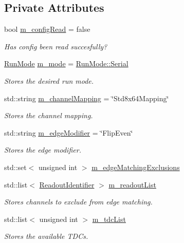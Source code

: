 \subsection*{Private Attributes}
\begin{DoxyCompactItemize}
\item 
bool \hyperlink{class_config_a82bcc998ae058699369aee4a189f0ad1}{m\+\_\+config\+Read} = false
\begin{DoxyCompactList}\small\item\em Has config been read succesfully? \end{DoxyCompactList}\item 
\hyperlink{_modes_enum_8hpp_a3dfe11cf1a3a8121f6cd7fec4bf5947e}{Run\+Mode} \hyperlink{class_config_a65b1f233533ce1e2acd85f6a4a07c4d4}{m\+\_\+mode} = \hyperlink{_modes_enum_8hpp_a3dfe11cf1a3a8121f6cd7fec4bf5947eaab27270f353006b03c91367e05e44b94}{Run\+Mode\+::\+Serial}
\begin{DoxyCompactList}\small\item\em Stores the desired run mode. \end{DoxyCompactList}\item 
std\+::string \hyperlink{class_config_ae3e78aedeeb5fa9a2bf7dcebeb0f4f31}{m\+\_\+channel\+Mapping} = \char`\"{}Std8x64\+Mapping\char`\"{}
\begin{DoxyCompactList}\small\item\em Stores the channel mapping. \end{DoxyCompactList}\item 
std\+::string \hyperlink{class_config_a70f6a43e8c14536beb7a03807c797d69}{m\+\_\+edge\+Modifier} = \char`\"{}Flip\+Even\char`\"{}
\begin{DoxyCompactList}\small\item\em Stores the edge modifier. \end{DoxyCompactList}\item 
std\+::set$<$ unsigned int $>$ \hyperlink{class_config_a98fedec819ec1ca13b66d82b806f49fd}{m\+\_\+edge\+Matching\+Exclusions}
\item 
std\+::list$<$ \hyperlink{class_readout_identifier}{Readout\+Identifier} $>$ \hyperlink{class_config_af1c0f310c245cfc6d9932646a36d5cf9}{m\+\_\+readout\+List}
\begin{DoxyCompactList}\small\item\em Stores channels to exclude from edge matching. \end{DoxyCompactList}\item 
std\+::list$<$ unsigned int $>$ \hyperlink{class_config_ac7295451d604cec09ed31ca74411c68c}{m\+\_\+tdc\+List}
\begin{DoxyCompactList}\small\item\em Stores the available T\+D\+Cs. \end{DoxyCompactList}\end{DoxyCompactItemize}


